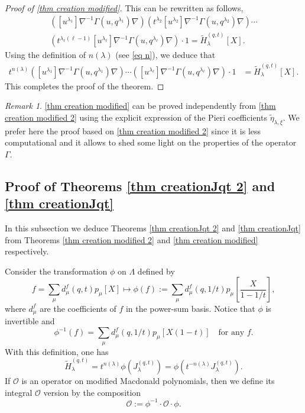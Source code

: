 \documentclass[12pt]{amsart}
\theoremstyle{remark}
\newtheorem{rmq}{Remark}
\newcommand{\tH}{\widetilde{H}^{(q,t)}}
\newcommand{\J}{{J}^{(q,t)}}
\begin{document}
\begin{proof}[Proof of \cref{thm creation modified}]
This can be rewritten as follows,
\begin{multline*}
\left([u^{\lambda_1}]\nabla^{-1}\Gamma(u,q^{\lambda_1})\nabla\right)
\left(t^{\lambda_2}[u^{\lambda_2}]\nabla^{-1}\Gamma(u,q^{\lambda_2})\nabla\right)\cdots \\
\left(t^{\lambda_\ell(\ell-1)}[u^{\lambda_\ell}]\nabla^{-1}\Gamma(u,q^{\lambda_{\ell}})\nabla\right)\cdot 1 =\tH_\lambda[X].
\end{multline*}
Using the definition of $n(\lambda)$ (see \cref{eq n}), we deduce that
\begin{align*}
t^{n(\lambda)}\left([u^{\lambda_1}]\nabla^{-1}\Gamma(u,q^{\lambda_1})\nabla\right)\cdots \left([u^{\lambda_\ell}]\nabla^{-1}\Gamma(u,q^{\lambda_{\ell}})\nabla\right)\cdot 1 & =\tH_\lambda[X].
\end{align*}
This completes the proof of the theorem.
\end{proof}

\begin{rmq}
    \cref{thm creation modified} can be proved independently from \cref{thm creation modified 2} using the explicit expression of the Pieri coefficients $\widetilde\eta_{\lambda,\xi}$. We prefer here the proof based on \cref{thm creation modified 2} since it is less computational and it allows to shed some light on the properties of the operator~$\Gamma$.
\end{rmq}

\subsection{Proof of Theorems \ref{thm creationJqt 2} and \ref{thm creationJqt}} \label{sec Proof}
In this subsection we deduce Theorems \ref{thm creationJqt 2} and \ref{thm creationJqt} from Theorems \ref{thm creation modified 2} and \ref{thm creation modified} respectively.

Consider the transformation $\phi$ on $\Lambda$ defined by
$$f=\sum_{\mu}d^f_\mu(q,t) p_\mu[X] \longmapsto\phi(f):=\sum_{\mu}d^f_\mu(q,1/t) p_\mu\left[\frac{X}{1-1/t}\right],$$ 
where $d^f_\mu$ are the coefficients of $f$ in the power-sum basis. Notice that $\phi$ is invertible and $$\phi^{-1}(f)=\sum_{\mu}d^f_\mu(q,1/t) p_\mu\left[X(1-t)\right] \quad \text{for any $f$.}$$ 
With this definition, one has
$$\tH_\lambda=t^{n(\lambda)}\phi(\J_\lambda)=\phi\left(t^{-n(\lambda)}\J_\lambda\right).$$
If $\mathcal{O}$ is an operator on modified Macdonald polynomials, then we define its integral $\boldsymbol{\mathcal{O}}$ version by the composition
\begin{equation}\label{eq OJ}
  \boldsymbol{\mathcal{O}}:=\phi^{-1}\cdot \mathcal{O}\cdot\phi.  
\end{equation}
\end{document}
